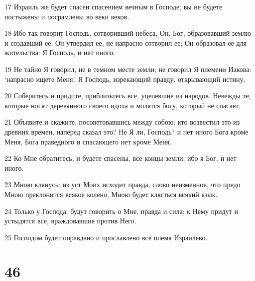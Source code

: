 \par 17 Израиль же будет спасен спасением вечным в Господе; вы не будете постыжены и посрамлены во веки веков.
\par 18 Ибо так говорит Господь, сотворивший небеса, Он, Бог, образовавший землю и создавший ее; Он утвердил ее, не напрасно сотворил ее; Он образовал ее для жительства: Я Господь, и нет иного.
\par 19 Не тайно Я говорил, не в темном месте земли; не говорил Я племени Иакова: `напрасно ищете Меня'. Я Господь, изрекающий правду, открывающий истину.
\par 20 Соберитесь и придите, приблизьтесь все, уцелевшие из народов. Невежды те, которые носят деревянного своего идола и молятся богу, который не спасает.
\par 21 Объявите и скажите, посоветовавшись между собою: кто возвестил это из древних времен, наперед сказал это? Не Я ли, Господь? и нет иного Бога кроме Меня, Бога праведного и спасающего нет кроме Меня.
\par 22 Ко Мне обратитесь, и будете спасены, все концы земли, ибо я Бог, и нет иного.
\par 23 Мною клянусь: из уст Моих исходит правда, слово неизменное, что предо Мною преклонится всякое колено, Мною будет клясться всякий язык.
\par 24 Только у Господа, будут говорить о Мне, правда и сила; к Нему придут и устыдятся все, враждовавшие против Него.
\par 25 Господом будет оправдано и прославлено все племя Израилево.

\chapter{46}

